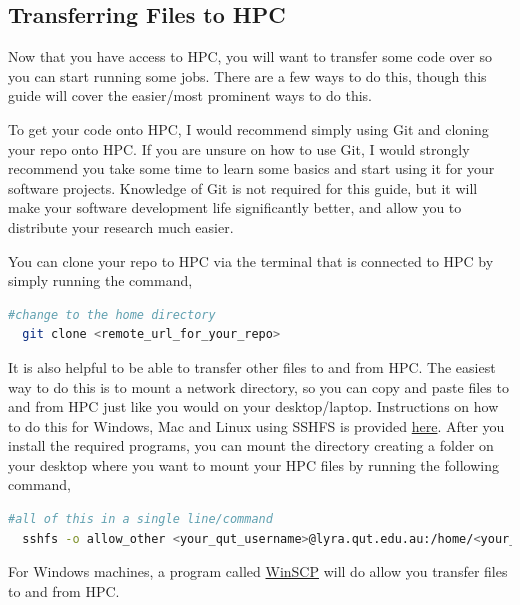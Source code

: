 \subsection{Transferring Files to HPC}
Now that you have access to HPC, you will want to transfer some code over so you can start running some jobs. There are a few ways to do this, though this guide will cover the easier/most prominent ways to do this.
%
%
\par
%
%
To get your code onto HPC, I would recommend simply using Git and cloning your repo onto HPC. If you are unsure on how to use Git, I would strongly recommend you take some time to learn some basics and start using it for your software projects. Knowledge of Git is not required for this guide, but it will make your software development life significantly better, and allow you to distribute your research much easier.
%
%
\par
%
%
You can clone your repo to HPC via the terminal that is connected to HPC by simply running the command,
\begin{lstlisting}[language=bash, frame=single]
  #change to the home directory
  git clone <remote_url_for_your_repo>
\end{lstlisting}
%
%
It is also helpful to be able to transfer other files to and from HPC. The easiest way to do this is to mount a network directory, so you can copy and paste files to and from HPC just like you would on your desktop/laptop. Instructions on how to do this for Windows, Mac and Linux using SSHFS is provided \href{https://www.digitalocean.com/community/tutorials/how-to-use-sshfs-to-mount-remote-file-systems-over-ssh}{here}. After you install the required programs, you can mount the directory creating a folder on your desktop where you want to mount your HPC files by running the following command,
%
%
\hspace*{-2cm}
\begin{lstlisting}[language=bash, breaklines=true, frame=single]
  #all of this in a single line/command
  sshfs -o allow_other <your_qut_username>@lyra.qut.edu.au:/home/<your_qut_username> <path_to_mount_location_on_desktop>
\end{lstlisting}
% 
%
%
\par
%
%
For Windows machines, a program called \href{https://winscp.net/eng/download.php}{WinSCP} will do allow you transfer files to and from HPC.

